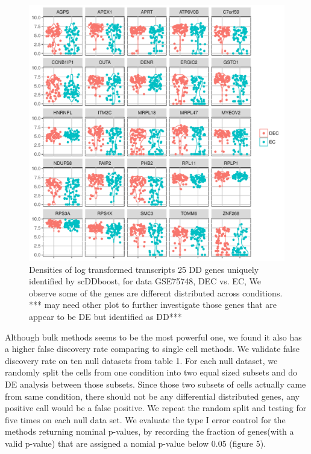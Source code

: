 \documentclass[11pt]{amsart}
\begin{document}
\begin{figure}[h]
\includegraphics[width = \textwidth]{density.pdf}
 \caption{ Densities of log transformed transcripts 25 DD genes uniquely identified by scDDboost, for data GSE75748, DEC vs. EC, We observe some of the genes are different distributed across conditions. *** may need other plot to further investigate those genes that are appear to be DE but identified as DD***}
  \label{fig:6}
\end{figure}
Although bulk methods seems to be the most powerful one, we found it also has a higher false discovery rate comparing to single cell methods. We validate false discovery rate on ten null datasets from table 1. For each null dataset, we randomly split the cells from one condition into two equal sized subsets and do DE analysis between those subsets. Since those two subsets of cells actually came from same condition, there should not be any differential distributed genes, any positive call would be a false positive. We repeat the random split and testing for five times on each null data set. We evaluate the type I error control for the methods returning nominal p-values, by recording the fraction of genes(with a valid p-value) that are assigned a nomial p-value below 0.05 (figure 5).\\
\end{document}
